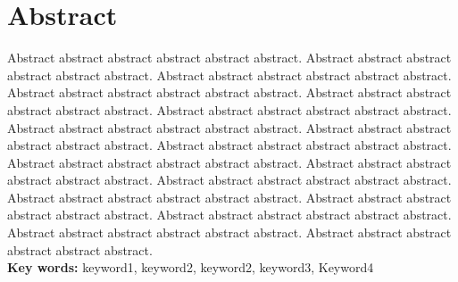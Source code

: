 
{
\chapter{Abstract}
Abstract abstract abstract abstract abstract abstract.
Abstract abstract abstract abstract abstract abstract.
Abstract abstract abstract abstract abstract abstract.
Abstract abstract abstract abstract abstract abstract.
Abstract abstract abstract abstract abstract abstract.
Abstract abstract abstract abstract abstract abstract.
Abstract abstract abstract abstract abstract abstract.
Abstract abstract abstract abstract abstract abstract.
Abstract abstract abstract abstract abstract abstract.
Abstract abstract abstract abstract abstract abstract.
Abstract abstract abstract abstract abstract abstract.
Abstract abstract abstract abstract abstract abstract.
Abstract abstract abstract abstract abstract abstract.
Abstract abstract abstract abstract abstract abstract.
Abstract abstract abstract abstract abstract abstract.
Abstract abstract abstract abstract abstract abstract.
Abstract abstract abstract abstract abstract abstract.\\

\noindent \textbf{Key words:} keyword1, keyword2, keyword2, keyword3, Keyword4
}
